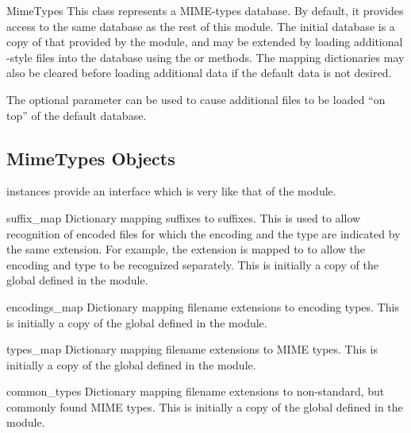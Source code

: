 \begin{classdesc}{MimeTypes}{}
  This class represents a MIME-types database.  By default, it
  provides access to the same database as the rest of this module.
  The initial database is a copy of that provided by the module, and
  may be extended by loading additional -style files
  into the database using the  or 
  methods.  The mapping dictionaries may also be cleared before
  loading additional data if the default data is not desired.

  The optional  parameter can be used to cause
  additional files to be loaded ``on top'' of the default database.

\end{classdesc}


\subsection{MimeTypes Objects \label{mimetypes-objects}}

 instances provide an interface which is very like
that of the  module.

\begin{datadesc}{suffix_map}
  Dictionary mapping suffixes to suffixes.  This is used to allow
  recognition of encoded files for which the encoding and the type are
  indicated by the same extension.  For example, the 
  extension is mapped to  to allow the encoding and type
  to be recognized separately.  This is initially a copy of the global
   defined in the module.
\end{datadesc}

\begin{datadesc}{encodings_map}
  Dictionary mapping filename extensions to encoding types.  This is
  initially a copy of the global  defined in the
  module.
\end{datadesc}

\begin{datadesc}{types_map}
  Dictionary mapping filename extensions to MIME types.  This is
  initially a copy of the global  defined in the
  module.
\end{datadesc}

\begin{datadesc}{common_types}
  Dictionary mapping filename extensions to non-standard, but commonly
  found MIME types.  This is initially a copy of the global
   defined in the module.
\end{datadesc}


